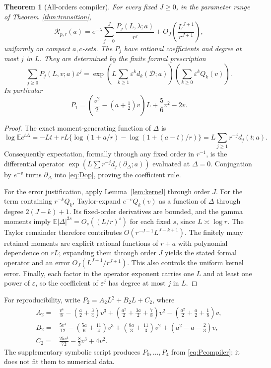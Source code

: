 \documentclass[11pt]{article}
\numberwithin{equation}{section}
\newtheorem{theorem}{Theorem}[section]
\theoremstyle{definition}\newtheorem{definition}[theorem]{Definition}
\theoremstyle{remark}\newtheorem{remark}[theorem]{Remark}
\newcommand{\E}{\mathbb E}\newcommand{\ii}{\mathrm i}
\newcommand{\calD}{\mathcal D}
\begin{document}
\begin{theorem}[All-orders compiler]\label{thm:allorders}
For every fixed $J\ge0$, in the parameter range of Theorem~\ref{thm:transition},
\begin{equation}\label{eq:allorders}
 \mathcal R_{p,r}(a)=e^{-\lambda}
 \sum_{j=0}^J\frac{P_j(L,\lambda;a)}{r^j}
 +O_{J}\left(\frac{L^{J+1}}{r^{J+1}}\right),
\end{equation}
uniformly on compact $a,c$-sets. The $P_j$ have rational coefficients and degree at most $j$ in $L$. They are determined by the finite formal prescription
\begin{equation}\label{eq:Pcompiler}
 \sum_{j\ge0}P_j(L,v;a)\varepsilon^j
 =\exp\left(L\sum_{k\ge1}\varepsilon^k d_k(\calD;a)\right)
       \left(\sum_{k\ge0}\varepsilon^kQ_k(v)\right).
\end{equation}
In particular
\begin{equation}\label{eq:P1}
 P_1=\left(\frac{v^2}{2}-(a+\tfrac12)v\right)L+\frac56v^2-2v.
\end{equation}
\end{theorem}
\begin{proof}
The exact moment-generating function of $\Delta$ is
\[
 \log\E e^{t\Delta}
 =-Lt+rL\{\log(1+a/r)-\log(1+(a-t)/r)\}
 =L\sum_{j\ge1}r^{-j}d_j(t;a).
\]
Consequently expectation, formally through any fixed order in $r^{-1}$, is the differential operator
$\exp(L\sum r^{-j}d_j(\partial_\Delta;a))$ evaluated at $\Delta=0$. Conjugation by $e^{-v}$ turns $\partial_\Delta$ into \eqref{eq:Dop}, proving the coefficient rule.

For the error justification, apply Lemma~\ref{lem:kernel} through order $J$. For the term containing $r^{-k}Q_k$, Taylor-expand $e^{-v}Q_k(v)$ as a function of $\Delta$ through degree $2(J-k)+1$. Its fixed-order derivatives are bounded, and the gamma moments imply
$\E|\Delta|^{2s}=O_s((L/r)^s)$ for each fixed $s$, since $L\asymp\log r$. The Taylor remainder therefore contributes
$O(r^{-J-1}L^{J-k+1})$. The finitely many retained moments are explicit rational functions of $r+a$ with polynomial dependence on $rL$; expanding them through order $J$ yields the stated formal operator and an error $O_J(L^{J+1}/r^{J+1})$. This also controls the uniform kernel error. Finally, each factor in the operator exponent carries one $L$ and at least one power of $\varepsilon$, so the coefficient of $\varepsilon^j$ has degree at most $j$ in $L$.
\end{proof}

For reproducibility, write $P_2=A_2L^2+B_2L+C_2$, where
\begin{align*}
 A_2={}&\frac{v^4}{8}-\left(\frac a2+\frac34\right)v^3
 +\left(\frac{a^2}{2}+\frac{3a}{2}+\frac78\right)v^2
 -\left(\frac{a^2}{2}+\frac a2+\frac18\right)v,\\
 B_2={}&\frac{5v^4}{12}-\left(\frac{5a}{6}+\frac{11}{4}\right)v^3
 +\left(\frac{8a}{3}+\frac{11}{3}\right)v^2
 +\left(a^2-a-\frac23\right)v,\\
 C_2={}&\frac{25v^4}{72}-\frac83v^3+4v^2.
\end{align*}
The supplementary symbolic script produces $P_0,\ldots,P_4$ from \eqref{eq:Pcompiler}; it does not fit them to numerical data.
\end{document}
